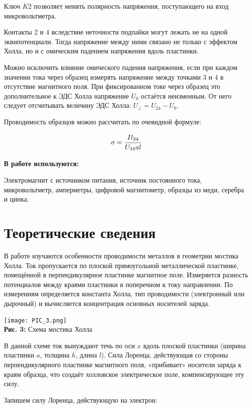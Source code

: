 \documentclass[12pt,a4paper]{scrartcl}
\begin{document}
	Ключ $K2$ позволяет менять полярность напряжения, поступающего на вход микровольтметра.	
		
	Контакты 2 и 4 вследствие неточности подпайки могут лежать не на одной эквипотенциали. Тогда напряжение между ними связано не только с эффектом Холла, но и с омическим падением напряжения вдоль пластинки.
	
	Можно исключить влияние омического падения напряжения, если при каждом значении тока через образец измерять на­пряжение между точками 3 и 4 в отсутствие магнитного поля. При фиксированном токе через образец это дополнительное к ЭДС Холла напряжение $U_0$ остаётся неизменным. От него следует отсчитывать величину ЭДС Холла:	$U_\perp = U_{24} - U_0$.
	
	Проводимость образцов можно рассчитать по очевидной формуле:
	
	$$\sigma = \dfrac{\strut Il_{34}}{\strut U_{34}al}$$
		
	\textbf{В работе используются:}
	
	Электромагнит с источником питания, источник постоянного тока, микровольтметр, амперметры, цифровой магнитометр, образцы из меди, серебра и цинка.
	
	\section{Теоретические сведения}
	
	В работе изучаются особенности проводимости металлов в геометрии мостика Холла. Ток пропускается по плоской прямоугольной металлической пластинке, помещённой в перпендикулярное пластинке магнитное поле. Измеряется разность потенциалов между краями пластинки в по­перечном к току направлении. По измерениям определяется константа Холла, тип проводимости (электронный или дырочный) и вычисляется концентрация основных носителей заряда.
	
	\begin{center}
		\texttt{[image: PIC\_3.png]}
		\\\textbf{Рис. 3:} Схема мостика Холла
	\end{center}
	
	В данной схеме ток вынуждают течь по оси $x$ вдоль плоской пластинки (ширина пластинки $a$, толщина $h$,
	длина $l$). Сила Лоренца, действующая со стороны перпендикулярного пластинке магнитного поля, «прибивает» носители заряда к краям образца, что создаёт холловское электрическое поле, компенсирующее эту	силу. 
	
	Запишем силу Лоренца, действующую на электрон:
	
\end{document}
